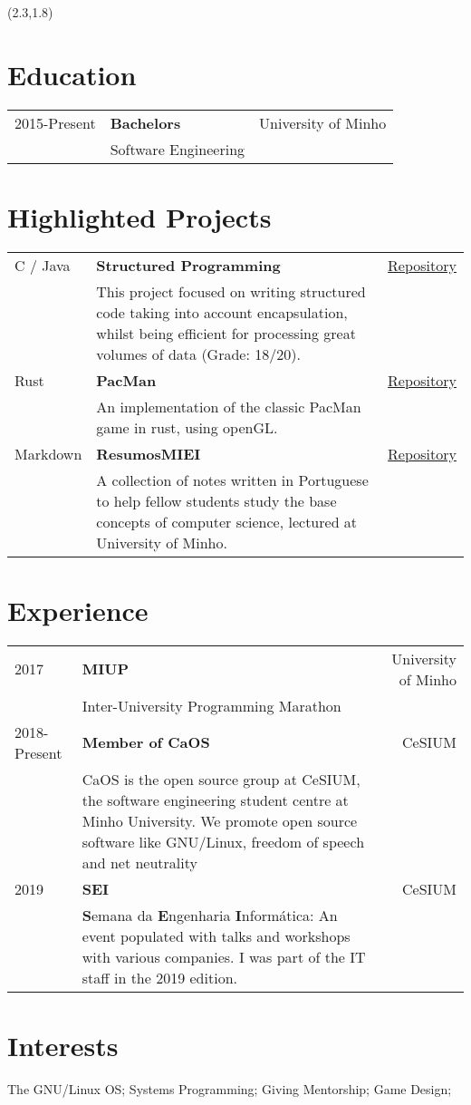 \documentclass{article}
\begin{document}
\begin{textblock}{7.3}(2.3,1.8)

    \section{Education}
    \begin{tabular}{lp{8.4cm}r}
        2015-Present & \textbf{Bachelors} & University of Minho\\
        & Software Engineering &
    \end{tabular}
    \section{Highlighted Projects}
    \begin{tabular}{lp{10.4cm}r}
        C / Java & \textbf{Structured Programming} & \href{https://github.com/Mendess2526/LI3_StructuredPrograming}{Repository}\\
        & This project focused on writing structured code taking into account
        encapsulation, whilst being efficient for processing great volumes of
        data (Grade: 18/20). &\\
        Rust & \textbf{PacMan} & \href{https://github.com/Mendess2526/rust-pacman}{Repository}\\
        & An implementation of the classic PacMan game in rust, using openGL. &\\
        Markdown & \textbf{ResumosMIEI} & \href{https://github.com/Mendess2526/ResumosMIEI}{Repository}\\
        & A collection of notes written in Portuguese to help fellow students
        study the base concepts of computer science, lectured at University of
        Minho. &
    \end{tabular}

    \section{Experience}
    \begin{tabular}{lp{8.4cm}r}
        2017 & \textbf{MIUP} & University of Minho\\
        & Inter-University Programming Marathon &\\
        2018-Present & \textbf{Member of CaOS} & CeSIUM\\
        & CaOS is the open source group at CeSIUM, the software engineering
        student centre at Minho University. We promote open source software
        like GNU/Linux, freedom of speech and net neutrality &\\
        2019 & \textbf{SEI} & CeSIUM \\
        & \textbf{S}emana da \textbf{E}ngenharia \textbf{I}nformática: An event
        populated with talks and workshops with various companies. I was part of
        the IT staff in the 2019 edition. &\\
    \end{tabular}

    \section{Interests}
    The GNU/Linux OS; Systems Programming; Giving Mentorship; Game Design;
\end{textblock}
\end{document}
